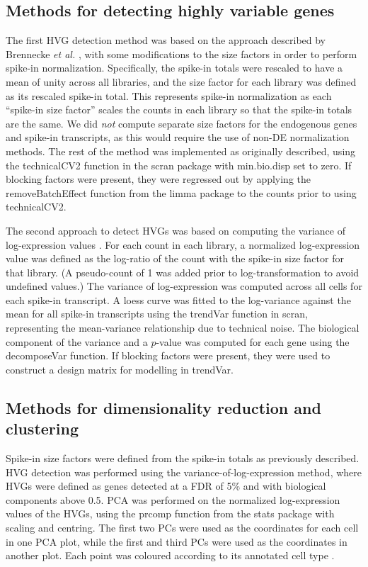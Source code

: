 \documentclass{article}
\begin{document}
\subsection{Methods for detecting highly variable genes}
The first HVG detection method was based on the approach described by Brennecke \textit{et al.} \cite{brennecke2013accounting}, with some modifications to the size factors in order to perform spike-in normalization.
Specifically, the spike-in totals were rescaled to have a mean of unity across all libraries, and the size factor for each library was defined as its rescaled spike-in total.
This represents spike-in normalization as each ``spike-in size factor'' scales the counts in each library so that the spike-in totals are the same. 
We did \textit{not} compute separate size factors for the endogenous genes and spike-in transcripts, as this would require the use of non-DE normalization methods.
The rest of the method was implemented as originally described, using the technicalCV2 function in the scran package with min.bio.disp set to zero.
If blocking factors were present, they were regressed out by applying the removeBatchEffect function from the limma package \cite{ritchie2015limma} to the counts prior to using technicalCV2.

The second approach to detect HVGs was based on computing the variance of log-expression values \cite{lun2016stepbystep}.
For each count in each library, a normalized log-expression value was defined as the log-ratio of the count with the spike-in size factor for that library.
(A pseudo-count of 1 was added prior to log-transformation to avoid undefined values.)
The variance of log-expression was computed across all cells for each spike-in transcript.
A loess curve was fitted to the log-variance against the mean for all spike-in transcripts using the trendVar function in scran, representing the mean-variance relationship due to technical noise.
The biological component of the variance and a $p$-value was computed for each gene using the decomposeVar function.
If blocking factors were present, they were used to construct a design matrix for modelling in trendVar.

\subsection{Methods for dimensionality reduction and clustering}
Spike-in size factors were defined from the spike-in totals as previously described. 
HVG detection was performed using the variance-of-log-expression method, where HVGs were defined as genes detected at a FDR of 5\% and with biological components above 0.5.
PCA was performed on the normalized log-expression values of the HVGs, using the prcomp function from the stats package with scaling and centring.
The first two PCs were used as the coordinates for each cell in one PCA plot, while the first and third PCs were used as the coordinates in another plot.
Each point was coloured according to its annotated cell type \cite{segerstople2016single}.
\end{document}
